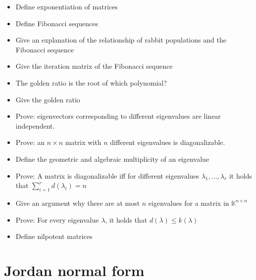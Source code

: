 \documentclass[a4paper]{article}
\begin{document}
\begin{itemize}
  \item Define exponentiation of matrices
  \item Define Fibonacci sequences
  \item Give an explanation of the relationship of rabbit populations and the Fibonacci sequence
  \item Give the iteration matrix of the Fibonacci sequence
  \item The golden ratio is the root of which polynomial?
  \item Give the golden ratio
  \item Prove: eigenvectors corresponding to different eigenvalues are linear independent.
  \item Prove: an $n\times n$ matrix with $n$ different eigenvalues is diagonalizable.
  \item Define the geometric and algebraic multiplicity of an eigenvalue
  \item Prove: A matrix is diagonalizable iff for different eigenvalues $\lambda_1, \dots, \lambda_r$ it holds that $\sum_{i=1}^r d(\lambda_i) = n$
  \item Give an argument why there are at most $n$ eigenvalues for a matrix in $\mathbb K^{n \times n}$
  \item Prove: For every eigenvalue $\lambda$, it holds that $d(\lambda) \leq k(\lambda)$
  \item Define nilpotent matrices
\end{itemize}

\section{Jordan normal form}
\end{document}
